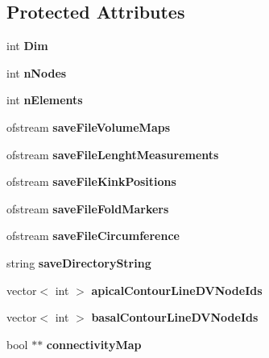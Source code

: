 \subsection*{Protected Attributes}
\begin{DoxyCompactItemize}
\item 
\hypertarget{classAnalysis_aa4b63b834e0f69b993cd7c553fb889ed}{}int {\bfseries Dim}\label{classAnalysis_aa4b63b834e0f69b993cd7c553fb889ed}

\item 
\hypertarget{classAnalysis_a9e3bd2d07de259cb97c9bdd074a6d12c}{}int {\bfseries n\+Nodes}\label{classAnalysis_a9e3bd2d07de259cb97c9bdd074a6d12c}

\item 
\hypertarget{classAnalysis_aca6ac275e44ea556d3ebd068879168e7}{}int {\bfseries n\+Elements}\label{classAnalysis_aca6ac275e44ea556d3ebd068879168e7}

\item 
\hypertarget{classAnalysis_a92e69c4a0ca11826eea8ef09b5ad8062}{}ofstream {\bfseries save\+File\+Volume\+Maps}\label{classAnalysis_a92e69c4a0ca11826eea8ef09b5ad8062}

\item 
\hypertarget{classAnalysis_a663cefebd46af276f8463f0ed50f6ed4}{}ofstream {\bfseries save\+File\+Lenght\+Measurements}\label{classAnalysis_a663cefebd46af276f8463f0ed50f6ed4}

\item 
\hypertarget{classAnalysis_a4ed23fc810d30c8c2afb2049aacfa2ba}{}ofstream {\bfseries save\+File\+Kink\+Positions}\label{classAnalysis_a4ed23fc810d30c8c2afb2049aacfa2ba}

\item 
\hypertarget{classAnalysis_a9797f24add837fc2cdea8b5d6ee16257}{}ofstream {\bfseries save\+File\+Fold\+Markers}\label{classAnalysis_a9797f24add837fc2cdea8b5d6ee16257}

\item 
\hypertarget{classAnalysis_a635889f9338fd1ca2052a4e7ad9c01c8}{}ofstream {\bfseries save\+File\+Circumference}\label{classAnalysis_a635889f9338fd1ca2052a4e7ad9c01c8}

\item 
\hypertarget{classAnalysis_ada1256e396c810e2e41a7426ff6a244c}{}string {\bfseries save\+Directory\+String}\label{classAnalysis_ada1256e396c810e2e41a7426ff6a244c}

\item 
\hypertarget{classAnalysis_abe81472c2406ea32d2b8de337d4413dc}{}vector$<$ int $>$ {\bfseries apical\+Contour\+Line\+D\+V\+Node\+Ids}\label{classAnalysis_abe81472c2406ea32d2b8de337d4413dc}

\item 
\hypertarget{classAnalysis_a19a3c5cc72cfda8e89381468fe6514b8}{}vector$<$ int $>$ {\bfseries basal\+Contour\+Line\+D\+V\+Node\+Ids}\label{classAnalysis_a19a3c5cc72cfda8e89381468fe6514b8}

\item 
\hypertarget{classAnalysis_ae89c1f247c29f905086a4eb9d5122a21}{}bool $\ast$$\ast$ {\bfseries connectivity\+Map}\label{classAnalysis_ae89c1f247c29f905086a4eb9d5122a21}

\end{DoxyCompactItemize}


